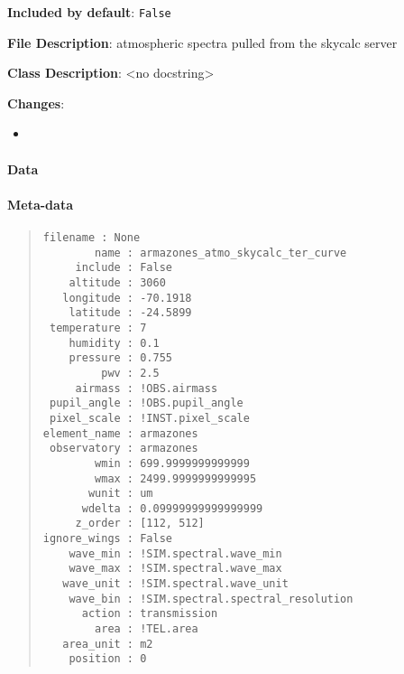 \textbf{Included by default}: \texttt{False}

\textbf{File Description}: atmospheric spectra pulled from the skycalc server

\textbf{Class Description}: <no docstring>

\textbf{Changes}:

\begin{itemize}
\item \end{itemize}


\paragraph{Data%
  \label{id3}%
}


\paragraph{Meta-data%
  \label{id4}%
}

\begin{quote}
\begin{alltt}
\begin{lstlisting}[frame=single]
    filename : None
        name : armazones_atmo_skycalc_ter_curve
     include : False
    altitude : 3060
   longitude : -70.1918
    latitude : -24.5899
 temperature : 7
    humidity : 0.1
    pressure : 0.755
         pwv : 2.5
     airmass : !OBS.airmass
 pupil_angle : !OBS.pupil_angle
 pixel_scale : !INST.pixel_scale
element_name : armazones
 observatory : armazones
        wmin : 699.9999999999999
        wmax : 2499.9999999999995
       wunit : um
      wdelta : 0.09999999999999999
     z_order : [112, 512]
ignore_wings : False
    wave_min : !SIM.spectral.wave_min
    wave_max : !SIM.spectral.wave_max
   wave_unit : !SIM.spectral.wave_unit
    wave_bin : !SIM.spectral.spectral_resolution
      action : transmission
        area : !TEL.area
   area_unit : m2
    position : 0
\end{lstlisting}
\end{alltt}
\end{quote}
